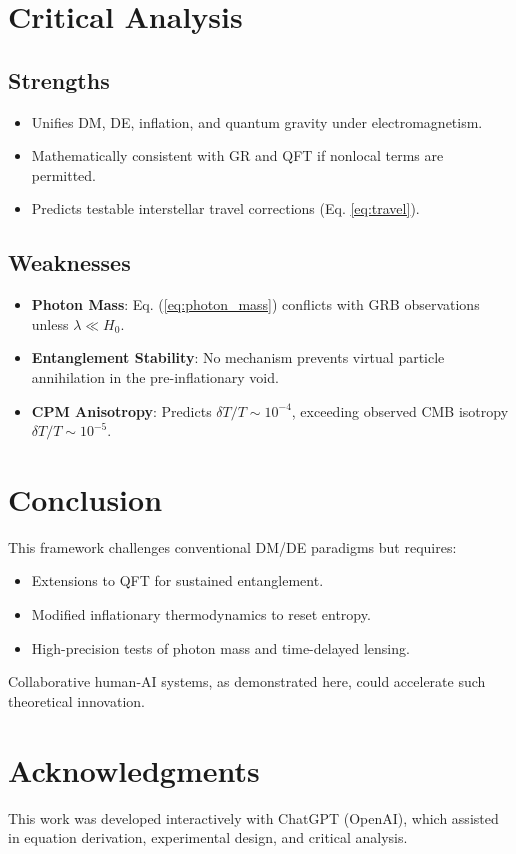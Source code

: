 \documentclass{article}
\begin{document}
\section{Critical Analysis}
\subsection{Strengths}
\begin{itemize}
\item Unifies DM, DE, inflation, and quantum gravity under electromagnetism.
\item Mathematically consistent with GR and QFT if nonlocal terms are permitted.
\item Predicts testable interstellar travel corrections (Eq. \ref{eq:travel}).
\end{itemize}

\subsection{Weaknesses}
\begin{itemize}
\item \textbf{Photon Mass}: Eq. (\ref{eq:photon_mass}) conflicts with GRB observations unless \( \lambda \ll H_0 \).
\item \textbf{Entanglement Stability}: No mechanism prevents virtual particle annihilation in the pre-inflationary void.
\item \textbf{CPM Anisotropy}: Predicts \( \delta T/T \sim 10^{-4} \), exceeding observed CMB isotropy \( \delta T/T \sim 10^{-5} \).
\end{itemize}

\section{Conclusion}
This framework challenges conventional DM/DE paradigms but requires:
\begin{itemize}
\item Extensions to QFT for sustained entanglement.
\item Modified inflationary thermodynamics to reset entropy.
\item High-precision tests of photon mass and time-delayed lensing.
\end{itemize}
Collaborative human-AI systems, as demonstrated here, could accelerate such theoretical innovation.

\section*{Acknowledgments}
This work was developed interactively with ChatGPT (OpenAI), which assisted in equation derivation, experimental design, and critical analysis.



\end{document}
